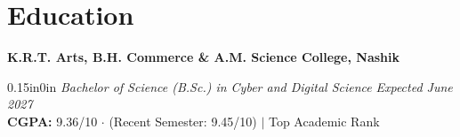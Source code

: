 \section{Education}

\noindent
{\large \textbf{K.R.T. Arts, B.H. Commerce \& A.M. Science College, Nashik}}
\begin{adjustwidth}{0.15in}{0in}
    \textit{Bachelor of Science (B.Sc.) in Cyber and Digital Science} \hfill \textit{Expected June 2027} \\[2pt]
    \textbf{CGPA:} 9.36/10 $\cdot$ (Recent Semester: 9.45/10) $|$ Top Academic Rank
\end{adjustwidth}
